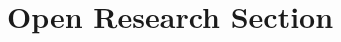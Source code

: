 \documentclass[draft]{agujournal2019}
\begin{document}


%








%
%

\section*{Open Research Section}
\end{document}
